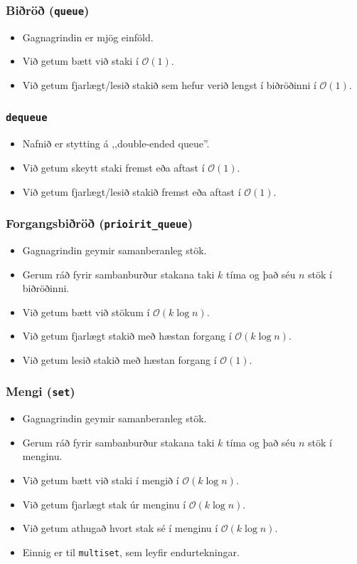 \documentclass[handout]{beamer}
\begin{document}
\begin{frame}
\frametitle{Biðröð (\texttt{queue})}
\begin{itemize}
	\item Gagnagrindin er mjög einföld.
	\item Við getum bætt við staki í $\mathcal{O}(1)$.
	\item Við getum fjarlægt/lesið stakið sem hefur verið lengst í biðröðinni í $\mathcal{O}(1)$.
\end{itemize}
\end{frame}

\begin{frame}
\frametitle{\texttt{dequeue}}
\begin{itemize}
	\item Nafnið er stytting á ,,double-ended queue''.
	\item Við getum skeytt staki fremst eða aftast í $\mathcal{O}(1)$.
	\item Við getum fjarlægt/lesið stakið fremst eða aftast í $\mathcal{O}(1)$.
\end{itemize}
\end{frame}

\begin{frame}
\frametitle{Forgangsbiðröð (\texttt{prioirit\_queue})}
\begin{itemize}
	\item Gagnagrindin geymir samanberanleg stök.
	\item Gerum ráð fyrir sambanburður stakana taki $k$ tíma og það séu $n$ stök í biðröðinni.
	\item Við getum bætt við stökum í $\mathcal{O}(k \log n)$.
	\item Við getum fjarlægt stakið með hæstan forgang í $\mathcal{O}(k \log n)$.
	\item Við getum lesið stakið með hæstan forgang í $\mathcal{O}(1)$.
\end{itemize}
\end{frame}

\begin{frame}
\frametitle{Mengi (\texttt{set})}
\begin{itemize}
	\item Gagnagrindin geymir samanberanleg stök.
	\item Gerum ráð fyrir sambanburður stakana taki $k$ tíma og það séu $n$ stök í menginu.
	\item Við getum bætt við staki í mengið í $\mathcal{O}(k \log n)$.
	\item Við getum fjarlægt stak úr menginu í $\mathcal{O}(k \log n)$.
	\item Við getum athugað hvort stak sé í menginu í $\mathcal{O}(k \log n)$.
	\item Einnig er til \texttt{multiset}, sem leyfir endurtekningar.
\end{itemize}
\end{frame}
\end{document}
